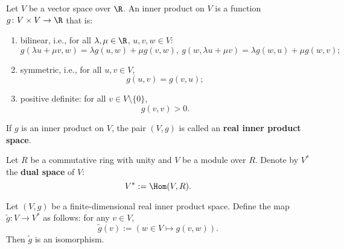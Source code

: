 \begin{definition}
  Let $V$ be a vector space over $\R$.
  An inner product on $V$ is a function $g \colon V \times V \to \R$ that is:
  \begin{enumerate}
    \item
      bilinear, i.e., for all $\lambda, \mu \in \R$, $u, v, w \in V$:
      \begin{equation}
        g(\lambda u + \mu v, w) = \lambda g(u, w) + \mu g(v, w),\
        g(w, \lambda u + \mu v) = \lambda g(w, u) + \mu g(w, v);
      \end{equation}
    \item
      symmetric, i.e., for all $u, v \in V$,
      \begin{equation}
        g(u, v) = g(v, u);
      \end{equation}
    \item
      positive definite: for all $v \in V \setminus \{0\}$,
      \begin{equation}
        g(v, v) > 0.
      \end{equation}
  \end{enumerate}
  If $g$ is an inner product on $V$, the pair $(V, g)$ is called an
  \textbf{real inner product space}.
\end{definition}
\begin{notation}
  Let $R$ be a commutative ring with unity and $V$ be a module over $R$.
  Denote by $V^*$ the \textbf{dual space} of $V$:
  \begin{equation}
    V^* := \Hom(V, R).
  \end{equation}
\end{notation}
\begin{proposition}
  Let $(V, g)$ be a finite-dimensional real inner product space.
  Define the map $\tilde{g} \colon V \to V^*$ as follows: for any $v \in V$,
  \begin{equation}
    \tilde{g}(v) := (w \in V \mapsto g(v, w)).
  \end{equation}
  Then $\tilde{g}$ is an isomorphism.
\end{proposition}
